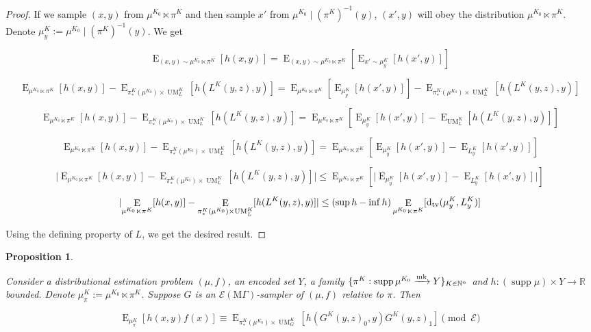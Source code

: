 \documentclass{article}
\numberwithin{equation}{section}
\theoremstyle{definition}
\theoremstyle{plain}
\newtheorem{proposition}{Proposition}[section]
\DeclareMathOperator{\Supp}{supp}
\DeclareMathOperator{\E}{E}
\DeclareMathOperator{\UM}{UM}
\newcommand{\Dtv}{\operatorname{d}_{\textnormal{tv}}}
\newcommand{\Nats}{\mathbb{N}}
\newcommand{\Reals}{\mathbb{R}}
\newcommand{\Abs}[1]{\lvert #1 \rvert}
\newcommand{\MGrow}{\mathrm{M}\Gamma}
\newcommand{\Fall}{\mathcal{E}}
\newcommand{\EMG}{\Fall(\MGrow)}
\newcommand{\Markov}{\xrightarrow{\textnormal{mk}}}
\begin{document}
\begin{proof}

If we sample $(x,y)$ from $\mu^{K_0} \ltimes \pi^K$ and then sample $x'$ from ${\mu^{K_0} \mid (\pi^K)^{-1}(y)}$, $(x',y)$ will obey the distribution $\mu^{K_0} \ltimes \pi^K$. Denote $\mu_y^K:=\mu^{K_0} \mid (\pi^K)^{-1}(y)$. We get

$$\E_{(x,y) \sim \mu^{K_0} \ltimes \pi^K}[h(x,y)] = \E_{(x,y) \sim \mu^{K_0} \ltimes \pi^K}[\E_{x' \sim \mu_y^K}[h(x',y)]]$$

$$\E_{\mu^{K_0} \ltimes \pi^K}[h(x,y)] - \E_{\pi_*^K(\mu^{K_0}) \times \UM_L^K}[h(L^K(y,z),y)] = \E_{\mu^{K_0} \ltimes \pi^K}[\E_{\mu_y^K}[h(x',y)]] - \E_{\pi_*^K(\mu^{K_0}) \times \UM_L^K}[h(L^K(y,z),y)]$$

$$\E_{\mu^{K_0} \ltimes \pi^K}[h(x,y)] - \E_{\pi_*^K(\mu^{K_0}) \times \UM_L^K}[h(L^K(y,z),y)] = \E_{\mu^{K_0} \ltimes \pi^K}[\E_{\mu_y^K}[h(x',y)]-\E_{\UM_L^K}[h(L^K(y,z),y)]]$$

$$\E_{\mu^{K_0} \ltimes \pi^K}[h(x,y)] - \E_{\pi_*^K(\mu^{K_0}) \times \UM_L^K}[h(L^K(y,z),y)] = \E_{\mu^{K_0} \ltimes \pi^K}[\E_{\mu_y^K}[h(x',y)]-\E_{L_y^K}[h(x',y)]]$$

$$\Abs{\E_{\mu^{K_0} \ltimes \pi^K}[h(x,y)] - \E_{\pi_*^K(\mu^{K_0}) \times \UM_L^K}[h(L^K(y,z),y)]} \leq \E_{\mu^{K_0} \ltimes \pi^K}[\Abs{\E_{\mu_y^K}[h(x',y)]-\E_{L_y^K}[h(x',y)]}]$$

$$\Abs{\E_{\mu^{K_0} \ltimes \pi^K}[h(x,y)] - \E_{\pi_*^K(\mu^{K_0}) \times \UM_L^K}[h(L^K(y,z),y)]} \leq (\sup h - \inf h) \E_{\mu^{K_0} \ltimes \pi^K}[\Dtv(\mu_y^K,L_y^K)]$$

Using the defining property of $L$, we get the desired result.
\end{proof}

\begin{proposition}
\label{prp:gen}

Consider a distributional estimation problem $(\mu,f)$, an encoded set $Y$, a family ${\{\pi^K: \Supp \mu^{K_0} \Markov Y\}_{K \in \Nats^n}}$ and ${h: (\Supp \mu) \times Y \rightarrow \Reals}$ bounded. Denote $\mu_\pi^K:=\mu^{K_0} \ltimes \pi^K$. Suppose $G$ is an $\EMG$-sampler of $(\mu,f)$ relative to $\pi$. Then

\begin{equation}
\E_{\mu_\pi^K}[h(x,y)f(x)] \equiv \E_{\pi_*^K(\mu^{K_0}) \times \UM_G^K}[h(G^K(y,z)_0,y)G^K(y,z)_1] \pmod \Fall
\end{equation}

\end{proposition}
\end{document}
